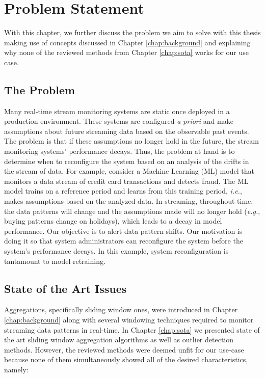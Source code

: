 \chapter{Problem Statement} \label{chap:statement} \minitoc

With this chapter, we further discuss the problem we aim to solve with this thesis making use of concepts discussed in Chapter \ref{chap:background} and explaining why none of the reviewed methods from Chapter \ref{chap:sota} works for our use case.

\section{The Problem} \label{sec:theproblem}
Many real-time stream monitoring systems are static once deployed in a production environment. These systems are configured \textit{a priori} and make assumptions about future streaming data based on the observable past events. The problem is that if these assumptions no longer hold in the future, the stream monitoring systems' performance decays. Thus, the problem at hand is to determine when to reconfigure the system based on an analysis of the drifts in the stream of data. For example, consider a Machine Learning (ML) model that monitors a data stream of credit card transactions and detects fraud. The ML model trains on a reference period and learns from this training period, \textit{i.e.}, makes assumptions based on the analyzed data. In streaming, throughout time, the data patterns will change and the assumptions made will no longer hold (\textit{e.g.}, buying patterns change on holidays), which leads to a decay in model performance. Our objective is to alert data pattern shifts. Our motivation is doing it so that system administrators can reconfigure the system before the system's performance decays. In this example, system reconfiguration is tantamount to model retraining.

\section{State of the Art Issues} \label{sec:sotaissues}
Aggregations, specifically sliding window ones, were introduced in Chapter \ref{chap:background} along with several windowing techniques required to monitor streaming data patterns in real-time. In Chapter \ref{chap:sota} we presented state of the art sliding window aggregation algorithms as well as outlier detection methods. However, the reviewed methods were deemed unfit for our use-case because none of them simultaneously showed all of the desired characteristics, namely:

